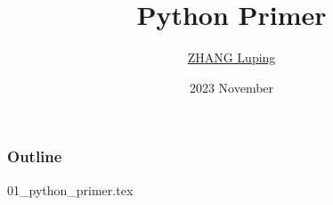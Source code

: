 \documentclass{beamer}
\title{Python Primer}
\author{\href{mailto:zlp@upc.edu.cn}{ZHANG Luping}}
\date{2023 November}
\begin{document}
\maketitle

\begin{frame}
    \frametitle{Outline}

    \tableofcontents

\end{frame}

{01_python_primer.tex}

\backmatter
\end{document}
